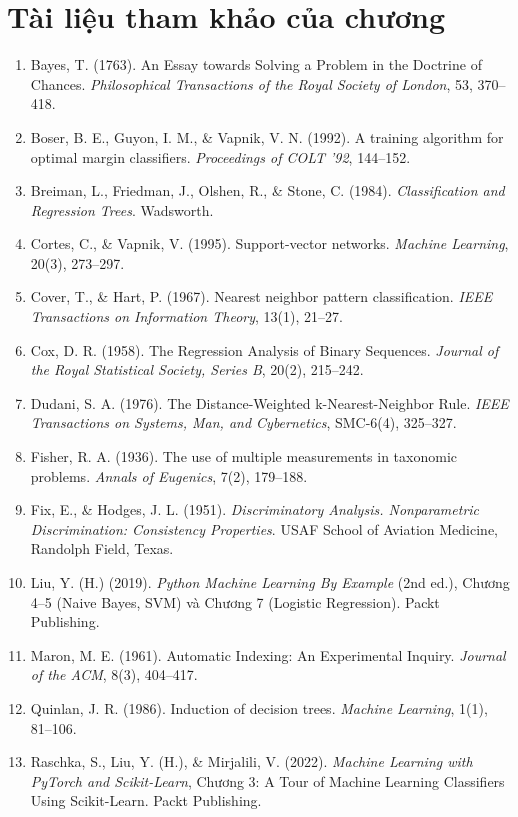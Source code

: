 \section*{Tài liệu tham khảo của chương}
\begin{enumerate}
    \item Bayes, T. (1763). An Essay towards Solving a Problem in the Doctrine of Chances. \textit{Philosophical Transactions of the Royal Society of London}, 53, 370--418.
    \item Boser, B. E., Guyon, I. M., \& Vapnik, V. N. (1992). A training algorithm for optimal margin classifiers. \textit{Proceedings of COLT '92}, 144--152.
    \item Breiman, L., Friedman, J., Olshen, R., \& Stone, C. (1984). \textit{Classification and Regression Trees}. Wadsworth.
    \item Cortes, C., \& Vapnik, V. (1995). Support-vector networks. \textit{Machine Learning}, 20(3), 273--297.
    \item Cover, T., \& Hart, P. (1967). Nearest neighbor pattern classification. \textit{IEEE Transactions on Information Theory}, 13(1), 21--27.
    \item Cox, D. R. (1958). The Regression Analysis of Binary Sequences. \textit{Journal of the Royal Statistical Society, Series B}, 20(2), 215--242.
    \item Dudani, S. A. (1976). The Distance-Weighted k-Nearest-Neighbor Rule. \textit{IEEE Transactions on Systems, Man, and Cybernetics}, SMC-6(4), 325--327.
    \item Fisher, R. A. (1936). The use of multiple measurements in taxonomic problems. \textit{Annals of Eugenics}, 7(2), 179--188.
    \item Fix, E., \& Hodges, J. L. (1951). \textit{Discriminatory Analysis. Nonparametric Discrimination: Consistency Properties}. USAF School of Aviation Medicine, Randolph Field, Texas.
    \item Liu, Y. (H.) (2019). \textit{Python Machine Learning By Example} (2nd ed.), Chương 4--5 (Naive Bayes, SVM) và Chương 7 (Logistic Regression). Packt Publishing.
    \item Maron, M. E. (1961). Automatic Indexing: An Experimental Inquiry. \textit{Journal of the ACM}, 8(3), 404--417.
    \item Quinlan, J. R. (1986). Induction of decision trees. \textit{Machine Learning}, 1(1), 81--106.
    \item Raschka, S., Liu, Y. (H.), \& Mirjalili, V. (2022). \textit{Machine Learning with PyTorch and Scikit-Learn}, Chương 3: A Tour of Machine Learning Classifiers Using Scikit-Learn. Packt Publishing.
\end{enumerate}
